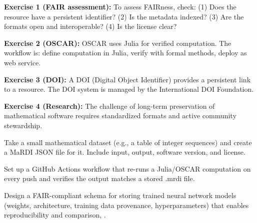 \begin{solution}
\textbf{Exercise 1 (FAIR assessment):} To assess FAIRness, check: (1) Does the resource have a persistent identifier? (2) Is the metadata indexed? (3) Are the formats open and interoperable? (4) Is the license clear?
\end{solution}

\begin{solution}
\textbf{Exercise 2 (OSCAR):} OSCAR uses Julia for verified computation. The workflow is: define computation in Julia, verify with formal methods, deploy as web service.
\end{solution}

\begin{solution}
\textbf{Exercise 3 (DOI):} A DOI (Digital Object Identifier) provides a persistent link to a resource. The DOI system is managed by the International DOI Foundation.
\end{solution}

\begin{solution}
\textbf{Exercise 4 (Research):} The challenge of long-term preservation of mathematical software requires standardized formats and active community stewardship.
\end{solution}

\label{sec:fair:exercises}

\begin{exercise}
Take a small mathematical dataset (e.g., a table of integer sequences) and create a MaRDI JSON file for it. Include input, output, software version, and license.
\end{exercise}

\begin{exercise}
Set up a GitHub Actions workflow that re-runs a Julia/OSCAR computation on every push and verifies the output matches a stored .mrdi file.
\end{exercise}

\begin{exercise}[Research]
Design a FAIR-compliant schema for storing trained neural network models (weights, architecture, training data provenance, hyperparameters) that enables reproducibility and comparison, \cite{bacher2026fair}.
\end{exercise}